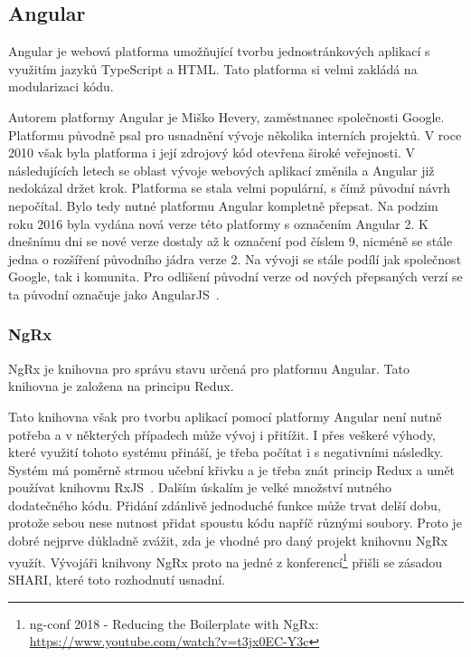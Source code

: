 \subsection{Angular}
Angular je webová platforma umožňující tvorbu jednostránkových aplikací s využitím jazyků TypeScript a HTML. Tato platforma si velmi zakládá na modularizaci kódu.
\blindtext[2] %

Autorem platformy Angular je Miško Hevery, zaměstnanec společnosti Google. Platformu původně psal pro usnadnění vývoje několika interních projektů. V roce 2010 však byla platforma i její zdrojový kód otevřena široké veřejnosti. V následujících letech se oblast vývoje webových aplikací změnila a Angular již nedokázal držet krok. Platforma se stala velmi populární, s čímž původní návrh nepočítal. Bylo tedy nutné platformu Angular kompletně přepsat. Na podzim roku 2016 byla vydána nová verze této platformy s označením Angular 2. K dnešnímu dni se nové verze dostaly až k označení pod číslem 9, nicméně se stále jedna o rozšíření původního jádra verze 2. Na vývoji se stále podílí jak společnost Google, tak i komunita. Pro odlišení původní verze od nových přepsaných verzí se ta původní označuje jako AngularJS~\cite{bib:angular-history}.

\subsubsection{NgRx}
NgRx je knihovna pro správu stavu určená pro platformu Angular. Tato knihovna je založena na principu Redux.
\blindtext %

Tato knihovna však pro tvorbu aplikací pomocí platformy Angular není nutně potřeba a v některých případech může vývoj i přitížit. I přes veškeré výhody, které využití tohoto systému přináší, je třeba počítat i s negativními následky. Systém má poměrně strmou učební křivku a je třeba znát princip Redux a umět používat knihovnu RxJS~\cite{bib:ngrx-docs}.
Dalším úskalím je velké množství nutného dodatečného kódu. Přidání zdánlivě jednoduché funkce může trvat delší dobu, protože sebou nese nutnost přidat spoustu kódu napříč různými soubory. Proto je dobré nejprve důkladně zvážit, zda je vhodné pro daný projekt knihovnu NgRx využít. Vývojáři knihvony NgRx proto na jedné z konferencí\footnote {ng-conf 2018 - Reducing the Boilerplate with NgRx: \url{https://www.youtube.com/watch?v=t3jx0EC-Y3c}} přišli se zásadou SHARI, které toto rozhodnutí usnadní. 

